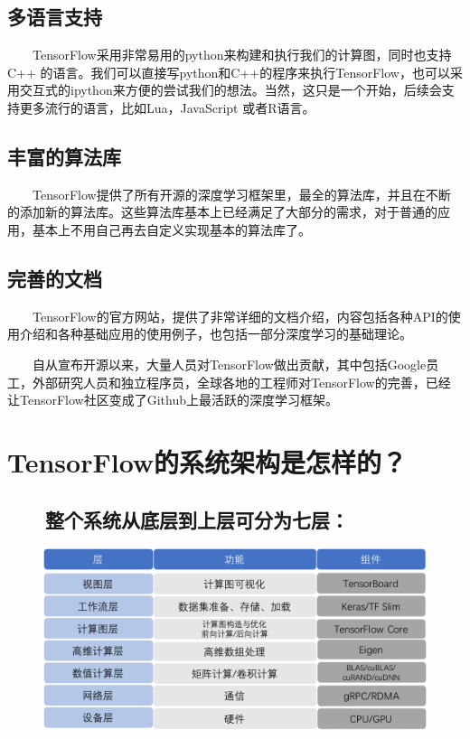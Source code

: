 \subsection{多语言支持}\label{ux591aux8bedux8a00ux652fux6301}

  TensorFlow采用非常易用的python来构建和执行我们的计算图，同时也支持 C++
的语言。我们可以直接写python和C++的程序来执行TensorFlow，也可以采用交互式的ipython来方便的尝试我们的想法。当然，这只是一个开始，后续会支持更多流行的语言，比如Lua，JavaScript
或者R语言。

\subsection{丰富的算法库}\label{ux4e30ux5bccux7684ux7b97ux6cd5ux5e93}

  TensorFlow提供了所有开源的深度学习框架里，最全的算法库，并且在不断的添加新的算法库。这些算法库基本上已经满足了大部分的需求，对于普通的应用，基本上不用自己再去自定义实现基本的算法库了。

\subsection{完善的文档}\label{ux5b8cux5584ux7684ux6587ux6863}

  TensorFlow的官方网站，提供了非常详细的文档介绍，内容包括各种API的使用介绍和各种基础应用的使用例子，也包括一部分深度学习的基础理论。

  自从宣布开源以来，大量人员对TensorFlow做出贡献，其中包括Google员工，外部研究人员和独立程序员，全球各地的工程师对TensorFlow的完善，已经让TensorFlow社区变成了Github上最活跃的深度学习框架。

\section{TensorFlow的系统架构是怎样的？}\label{tensorflowux7684ux7cfbux7edfux67b6ux6784ux662fux600eux6837ux7684}

\subsection{  整个系统从底层到上层可分为七层：}\label{ux6574ux4e2aux7cfbux7edfux4eceux5e95ux5c42ux5230ux4e0aux5c42ux53efux5206ux4e3aux4e03ux5c42}

\begin{figure}
\centering
\includegraphics{./img/ch12/1.bmp}
\caption{}
\end{figure}

